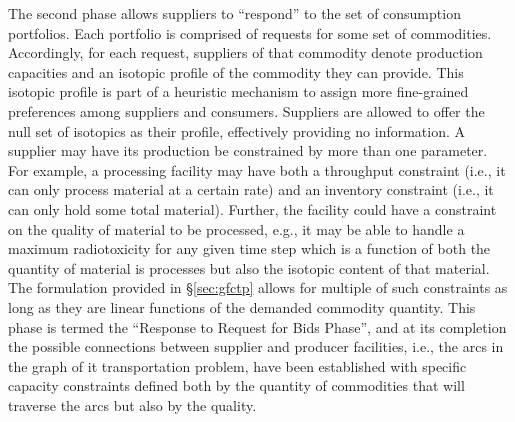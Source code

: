 The second phase allows suppliers to ``respond'' to the set of consumption
portfolios. Each portfolio is comprised of requests for some set of
commodities. Accordingly, for each request, suppliers of that commodity denote
production capacities and an isotopic profile of the commodity they can
provide. This isotopic profile is part of a heuristic mechanism to assign more
fine-grained preferences among suppliers and consumers. Suppliers are allowed to
offer the null set of isotopics as their profile, effectively providing no
information. A supplier may have its production be constrained by more than one
parameter. For example, a processing facility may have both a throughput
constraint (i.e., it can only process material at a certain rate) and an
inventory constraint (i.e., it can only hold some total material). Further, the
facility could have a constraint on the quality of material to be processed,
e.g., it may be able to handle a maximum radiotoxicity for any given time step
which is a function of both the quantity of material is processes but also the
isotopic content of that material. The formulation provided in \S\ref{sec:gfctp}
allows for multiple of such constraints as long as they are linear functions of
the demanded commodity quantity. This phase is termed the ``Response to Request
for Bids Phase'', and at its completion the possible connections between supplier and
producer facilities, i.e., the arcs in the graph of it transportation problem,
have been established with specific capacity constraints defined both by the
quantity of commodities that will traverse the arcs but also by the quality.


